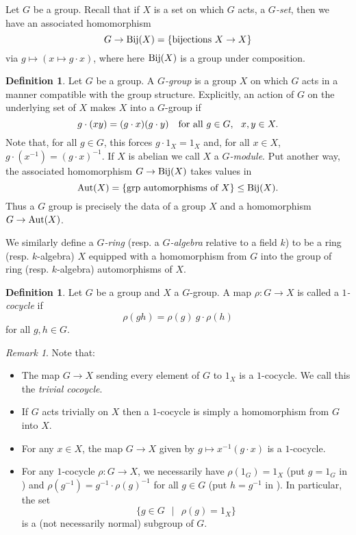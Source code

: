 \documentclass[11pt]{amsart}
\numberwithin{equation}{section}
\theoremstyle{remark}
\newtheorem{remark}[equation]{Remark}
\theoremstyle{remark}
\theoremstyle{remark}
\theoremstyle{definition}
\theoremstyle{definition}
\theoremstyle{definition}
\newtheorem{defi}[equation]{Definition}
\theoremstyle{definition}
\theoremstyle{definition}
\theoremstyle{definition}
\begin{document}
Let $G$ be a group. Recall that if $X$ is a set on which $G$ acts, a $G$\textit{-set}, then we have an associated homomorphism \[G\rightarrow \textup{Bij}(X)=\{\textup{bijections }X\rightarrow X\}\]
via $g\mapsto (x\mapsto g\cdot x)$, where here $\textup{Bij}(X)$ is a group under composition. 

\begin{defi} \label{Ggp defi}
Let $G$ be a group.  A $G$\textit{-group} is a group $X$ on which $G$ acts in a manner compatible with the group structure. Explicitly, an action of $G$ on the underlying set of $X$ makes $X$ into a $G$-group if \[g\cdot (xy)=(g\cdot x)(g\cdot y)~~\textup{ for all }g\in G,~~x,y\in X.\]
Note that, for all $g\in G$, this forces $g\cdot 1_X=1_X$ and, for all $x\in X$, $g\cdot (x^{-1})=(g\cdot x)^{-1}$. If $X$ is abelian we call $X$ a $G$\textit{-module}.
Put another way, the associated homomorphism $G\rightarrow \textup{Bij}(X)$ takes values in \[\textup{Aut}(X)=\{\textup{grp automorphisms of }X\}\leq \textup{Bij}(X).\] Thus a $G$ group is precisely the data of a group $X$ and a homomorphism $G\rightarrow \textup{Aut}(X)$. 

We similarly define a $G$\textit{-ring}  (resp. a $G$\textit{-algebra} relative to a field $k$) to be a ring (resp. $k$-algebra) $X$ equipped with a homomorphism from $G$ into the group of ring (resp. $k$-algebra) automorphisms of $X$.
\end{defi}

\begin{defi}
Let $G$ be a group and $X$ a $G$-group. A map $\rho:G\rightarrow X$ is called a $1$\textit{-cocycle} if 
\begin{equation} \label{cocycle condition}
\rho(gh)=\rho(g)~g\cdot \rho(h)
\end{equation}
for all $g,h \in G$. 
\end{defi}

\begin{remark} \label{cocycle remarks}
Note that:
\begin{itemize}
\item The map $G\rightarrow X$ sending every element of $G$ to $1_X$ is a $1$-cocycle. We call this the \textit{trivial cocoycle}.
\item If $G$ acts trivially on $X$ then a $1$-cocycle is simply a homomorphism from $G$ into $X$.
\item  For any $x\in X$, the map $G\rightarrow X$ given by $g\mapsto x^{-1}(g\cdot x)$ is a $1$-cocycle.
\item For any $1$-cocycle $\rho:G\rightarrow X$, we necessarily have $\rho(1_G)=1_X$ (put $g=1_G$ in ) and $\rho(g^{-1})=g^{-1}\cdot\rho(g)^{-1}$ for all $g\in G$ (put $h=g^{-1}$ in ). In particular, the set
\[\{g\in G~~\mid ~~\rho(g)=1_X\}\]
is a (not necessarily normal)  subgroup of $G$.
\end{itemize}
\end{remark}
\end{document}
